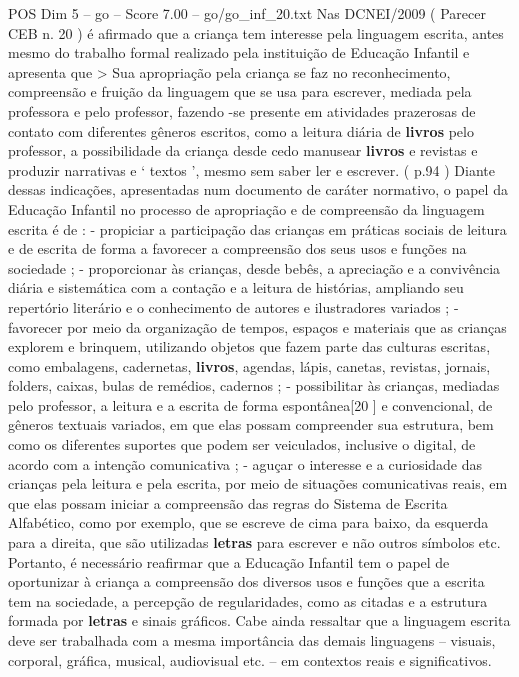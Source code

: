 \begin{textsample}{POS Dim 5 – go – Score 7.00 – go/go\_inf\_20.txt}
Nas DCNEI/2009 ( Parecer CEB n. 20 ) é afirmado que a criança tem interesse pela linguagem escrita, antes mesmo do trabalho formal realizado pela instituição de Educação Infantil e apresenta que > Sua apropriação pela criança se faz no reconhecimento, compreensão e fruição da linguagem que se usa para escrever, mediada pela professora e pelo professor, fazendo -se presente em atividades prazerosas de contato com diferentes gêneros escritos, como a leitura diária de \textbf{livros} pelo professor, a possibilidade da criança desde cedo manusear \textbf{livros} e revistas e produzir narrativas e ‘ textos ’, mesmo sem saber ler e escrever. ( p.94 ) Diante dessas indicações, apresentadas num documento de caráter normativo, o papel da Educação Infantil no processo de apropriação e de compreensão da linguagem escrita é de : - propiciar a participação das crianças em práticas sociais de leitura e de escrita de forma a favorecer a compreensão dos seus usos e funções na sociedade ; - proporcionar às crianças, desde bebês, a apreciação e a convivência diária e sistemática com a contação e a leitura de histórias, ampliando seu repertório literário e o conhecimento de autores e ilustradores variados ; - favorecer por meio da organização de tempos, espaços e materiais que as crianças explorem e brinquem, utilizando objetos que fazem parte das culturas escritas, como embalagens, cadernetas, \textbf{livros}, agendas, lápis, canetas, revistas, jornais, folders, caixas, bulas de remédios, cadernos ; - possibilitar às crianças, mediadas pelo professor, a leitura e a escrita de forma espontânea[20 ] e convencional, de gêneros textuais variados, em que elas possam compreender sua estrutura, bem como os diferentes suportes que podem ser veiculados, inclusive o digital, de acordo com a intenção comunicativa ; - aguçar o interesse e a curiosidade das crianças pela leitura e pela escrita, por meio de situações comunicativas reais, em que elas possam iniciar a compreensão das regras do Sistema de Escrita Alfabético, como por exemplo, que se escreve de cima para baixo, da esquerda para a direita, que são utilizadas \textbf{letras} para escrever e não outros símbolos etc.
Portanto, é necessário reafirmar que a Educação Infantil tem o papel de oportunizar à criança a compreensão dos diversos usos e funções que a escrita tem na sociedade, a percepção de regularidades, como as citadas e a estrutura formada por \textbf{letras} e sinais gráficos.
Cabe ainda ressaltar que a linguagem escrita deve ser trabalhada com a mesma importância das demais linguagens – visuais, corporal, gráfica, musical, audiovisual etc. – em contextos reais e significativos.

\end{textsample}
